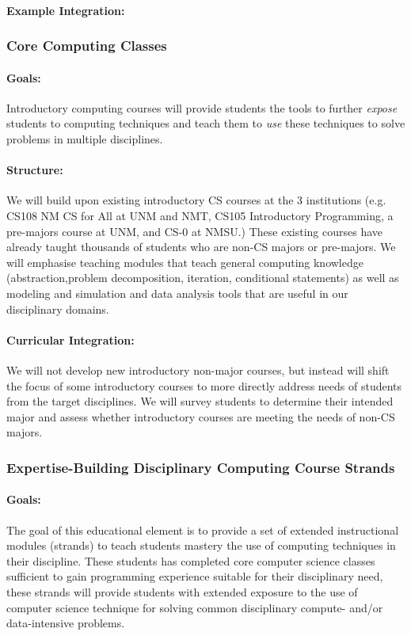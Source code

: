 \paragraph{Example Integration:}

\subsubsection{Core Computing Classes}
\paragraph{Goals:} Introductory computing courses will provide  students the tools to further \emph{expose} students to computing techniques and teach them to \emph{use} these techniques to solve problems in multiple disciplines.

\paragraph{Structure:} We will build upon existing introductory CS courses at the 3 institutions (e.g. CS108 NM CS for All at UNM and NMT, CS105 Introductory Programming, a pre-majors course at UNM, and CS-0 at NMSU.) These existing courses have already taught thousands of students who are non-CS majors or pre-majors. We will emphasise teaching modules that teach general computing knowledge (abstraction,problem decomposition, iteration, conditional statements) as well as modeling and simulation and data analysis tools that are useful in our disciplinary domains.

\paragraph{Curricular Integration:}
We will not develop new introductory non-major courses, but instead will shift the focus of some introductory courses to more directly address needs of students from the target disciplines. We will survey students to determine their intended major and assess whether introductory courses are meeting the needs of non-CS majors.

\subsubsection{Expertise-Building Disciplinary Computing Course Strands}
\paragraph{Goals:} The goal of this educational element is to provide a set of extended instructional modules (strands) to teach students mastery the use of computing techniques in their discipline. These students has completed core computer science classes sufficient to gain programming experience suitable for their disciplinary need, these strands will provide students with extended exposure to the use of computer science technique for solving common disciplinary compute- and/or data-intensive problems. 

